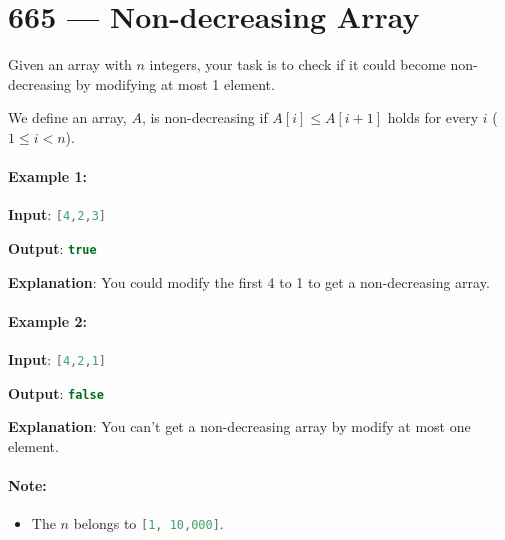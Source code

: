 \section{665 --- Non-decreasing Array}
Given an array with $n$ integers, your task is to check if it could become non-decreasing by modifying at most 1 element.

We define an array, $A$, is non-decreasing if $A[i] \leq A[i + 1]$ holds for every $i$ ($1 \leq i < n$).

\paragraph{Example 1:}

\begin{flushleft}

\textbf{Input}: \lstinline[language=C++, basicstyle=\small\ttfamily, keywordstyle=\bfseries\color{green!40!black}]|[4,2,3]|

\textbf{Output}: \lstinline[language=C++, basicstyle=\small\ttfamily, keywordstyle=\bfseries\color{green!40!black}]|true|

\textbf{Explanation}: You could modify the first 4 to 1 to get a non-decreasing array.

\end{flushleft}

\paragraph{Example 2:}

\begin{flushleft}

\textbf{Input}: \lstinline[language=C++, basicstyle=\small\ttfamily, keywordstyle=\bfseries\color{green!40!black}]|[4,2,1]|

\textbf{Output}: \lstinline[language=C++, basicstyle=\small\ttfamily, keywordstyle=\bfseries\color{green!40!black}]|false|

\textbf{Explanation}: You can't get a non-decreasing array by modify at most one element.

\end{flushleft}


\paragraph{Note:} 

\begin{itemize}
\item The $n$ belongs to \lstinline[language=C++, basicstyle=\small\ttfamily, keywordstyle=\bfseries\color{green!40!black}]|[1, 10,000]|. 
\end{itemize}

